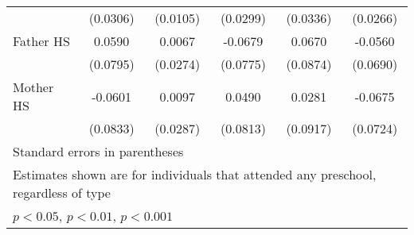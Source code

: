 \begin{table}[htbp]
\begin{tabular}{l*{5}{c}}
            &    (0.0306)         &    (0.0105)         &    (0.0299)         &    (0.0336)         &    (0.0266)         \\
\addlinespace
Father HS   &      0.0590         &      0.0067         &     -0.0679         &      0.0670         &     -0.0560         \\
            &    (0.0795)         &    (0.0274)         &    (0.0775)         &    (0.0874)         &    (0.0690)         \\
\addlinespace
Mother HS   &     -0.0601         &      0.0097         &      0.0490         &      0.0281         &     -0.0675         \\
            &    (0.0833)         &    (0.0287)         &    (0.0813)         &    (0.0917)         &    (0.0724)         \\
\bottomrule
\multicolumn{6}{l}{\footnotesize Standard errors in parentheses}\\
\multicolumn{6}{l}{\footnotesize Estimates shown are for individuals that attended any preschool, regardless of type}\\
\multicolumn{6}{l}{\footnotesize \sym{*} \(p<0.05\), \sym{**} \(p<0.01\), \sym{***} \(p<0.001\)}\\
\end{tabular}
\end{table}
